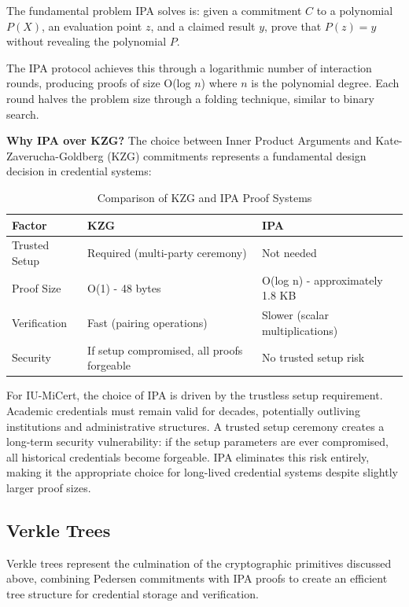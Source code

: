 The fundamental problem IPA solves is: given a commitment $C$ to a polynomial $P(X)$, an evaluation point $z$, and a claimed result $y$, prove that $P(z) = y$ without revealing the polynomial $P$.

The IPA protocol achieves this through a logarithmic number of interaction rounds, producing proofs of size O(log $n$) where $n$ is the polynomial degree. Each round halves the problem size through a folding technique, similar to binary search.

\textbf{Why IPA over KZG?} The choice between Inner Product Arguments and Kate-Zaverucha-Goldberg (KZG) commitments represents a fundamental design decision in credential systems:

\begin{table}[H]
\centering
\caption{Comparison of KZG and IPA Proof Systems}
\label{tab:kzg-ipa}
\begin{tabular}{|p{3cm}|p{5.5cm}|p{4.5cm}|}
\hline
\textbf{Factor} & \textbf{KZG} & \textbf{IPA} \\
\hline
Trusted Setup & Required (multi-party ceremony) & Not needed \\
\hline
Proof Size & O(1) - 48 bytes & O(log n) - approximately 1.8 KB \\
\hline
Verification & Fast (pairing operations) & Slower (scalar multiplications) \\
\hline
Security & If setup compromised, all proofs forgeable & No trusted setup risk \\
\hline
\end{tabular}
\end{table}

For IU-MiCert, the choice of IPA is driven by the trustless setup requirement. Academic credentials must remain valid for decades, potentially outliving institutions and administrative structures. A trusted setup ceremony creates a long-term security vulnerability: if the setup parameters are ever compromised, all historical credentials become forgeable. IPA eliminates this risk entirely, making it the appropriate choice for long-lived credential systems despite slightly larger proof sizes.

\subsection{Verkle Trees}
\label{subsec:verkle_trees}

Verkle trees represent the culmination of the cryptographic primitives discussed above, combining Pedersen commitments with IPA proofs to create an efficient tree structure for credential storage and verification.

